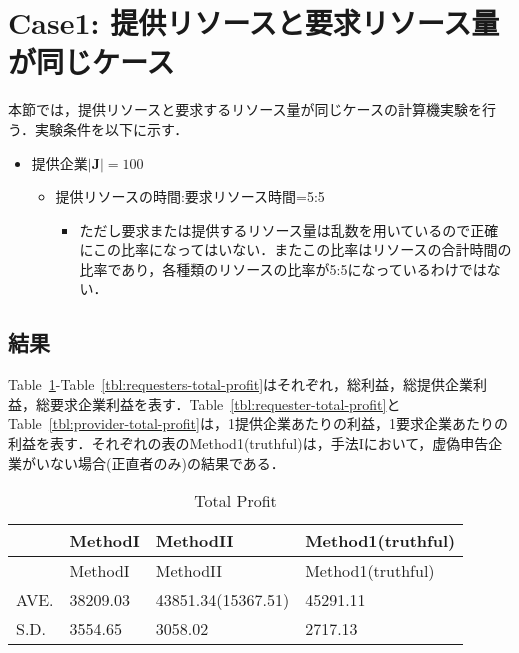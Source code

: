 \hypertarget{case1-ux63d0ux4f9bux30eaux30bdux30fcux30b9ux3068ux8981ux6c42ux30eaux30bdux30fcux30b9ux91cfux304cux540cux3058ux30b1ux30fcux30b9}{%
\section{Case1:
提供リソースと要求リソース量が同じケース}\label{case1-ux63d0ux4f9bux30eaux30bdux30fcux30b9ux3068ux8981ux6c42ux30eaux30bdux30fcux30b9ux91cfux304cux540cux3058ux30b1ux30fcux30b9}}

本節では，提供リソースと要求するリソース量が同じケースの計算機実験を行う．実験条件を以下に示す．

\begin{itemize}
\tightlist
\item
  提供企業\(|\boldsymbol{J}|=100\)

  \begin{itemize}
  \tightlist
  \item
    提供リソースの時間:要求リソース時間=5:5

    \begin{itemize}
    \tightlist
    \item
      ただし要求または提供するリソース量は乱数を用いているので正確にこの比率になってはいない．またこの比率はリソースの合計時間の比率であり，各種類のリソースの比率が5:5になっているわけではない．
    \end{itemize}
  \end{itemize}
\end{itemize}

\hypertarget{ux7d50ux679c-1}{%
\subsection{結果}\label{ux7d50ux679c-1}}

Table~\ref{tbl:total-profit}-Table~\ref{tbl:requesters-total-profit}はそれぞれ，総利益，総提供企業利益，総要求企業利益を表す．Table~\ref{tbl:requester-total-profit}とTable~\ref{tbl:provider-total-profit}は，1提供企業あたりの利益，1要求企業あたりの利益を表す．それぞれの表のMethod1(truthful)は，手法Iにおいて，虚偽申告企業がいない場合(正直者のみ)の結果である．

\hypertarget{tbl:total-profit}{}
\begin{longtable}[H]{@{}llll@{}}
\caption{\label{tbl:total-profit}Total Profit}\tabularnewline
\toprule
& MethodI & MethodII & Method1(truthful)\tabularnewline
\midrule
\endfirsthead
\toprule
& MethodI & MethodII & Method1(truthful)\tabularnewline
\midrule
\endhead
AVE. & 38209.03 & 43851.34(15367.51) & 45291.11\tabularnewline
S.D. & 3554.65 & 3058.02 & 2717.13\tabularnewline
\bottomrule
\end{longtable}

